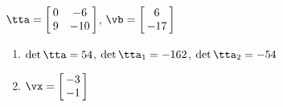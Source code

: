 {$\tta = \left[\hskip -3pt \begin{array}{cc} 0&-6\\  9&-10\end {array} \hskip -3pt
 \right]$,
 \quad
$\vb = \left[\hskip -3pt \begin{array}{c} 6\\  -17\end {array} \hskip -3pt
 \right]$}
{\begin{enumerate}
\item	$\det{\tta} = 54$, $\det{\tta_1} = -162$, $\det{\tta_2} = -54$
\item $\vx = \left[\hskip -3pt \begin{array}{c} -3\\  -1\end {array} \hskip -3pt
 \right]$
 \end{enumerate}
}
 
